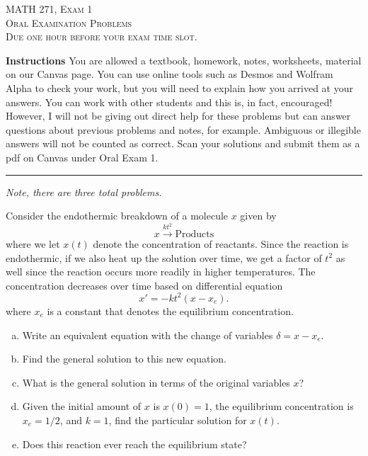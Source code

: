 \documentclass[12pt]{amsbook}
\begin{document}

\begin{center}
   \textsc{\large MATH 271, Exam 1}\\
   \textsc{Oral Examination Problems}\\
   \textsc{Due one hour before your exam time slot.}
\end{center}

\vspace{1cm}

\noindent\textbf{Instructions} \; You are allowed a textbook, homework, notes, worksheets, material on our Canvas page.  You can use online tools such as Desmos and Wolfram Alpha to check your work, but you will need to explain how you arrived at your answers.  You can work with other students and this is, in fact, encouraged! However, I will not be giving out direct help for these problems but can answer questions about previous problems and notes, for example. Ambiguous or illegible answers will not be counted as correct. Scan your solutions and submit them as a pdf on Canvas under Oral Exam 1.


\vspace{1cm}


\hrule

\vspace*{1cm}
\noindent\emph{Note, there are three total problems.}

\newpage

\begin{problem}
Consider the endothermic breakdown of a molecule $x$ given by
\[
x \xrightarrow{kt^2} \textrm{Products}
\]
where we let $x(t)$ denote the concentration of reactants. Since the reaction is endothermic, if we also heat up the solution over time, we get a factor of $t^2$ as well since the reaction occurs more readily in higher temperatures. The concentration decreases over time based on differential equation
\[
x'=-kt^2(x-x_e).
\]
where $x_e$ is a constant that denotes the equilibrium concentration.
\begin{enumerate}[(a)]
    \item Write an equivalent equation with the change of variables $\delta=x-x_e$.
    \item Find the general solution to this new equation.
    \item What is the general solution in terms of the original variables $x$?
    \item Given the initial amount of $x$ is $x(0)=1$, the equilibrium concentration is $x_e=1/2$, and $k=1$, find the particular solution for $x(t)$.
    \item Does this reaction ever reach the equilibrium state?
\end{enumerate}
\end{problem}
\end{document}

